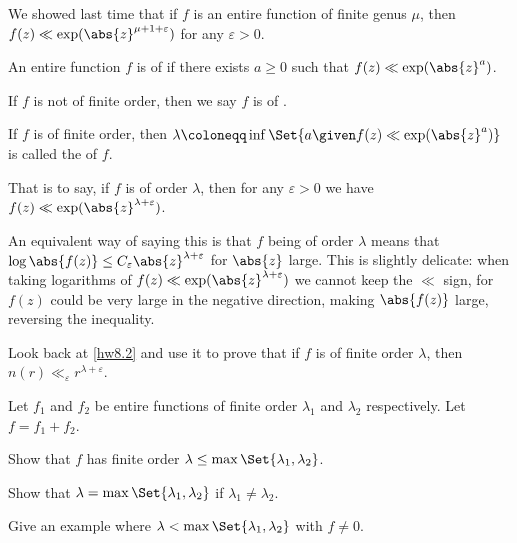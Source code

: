 


We showed last time that if $f$ is an entire function of finite genus $\mu$, then $f(z) \ll \exp(\abs{z}^{\mu + 1 + \varepsilon})$ for any $\varepsilon > 0$.

\begin{definition}[Order]
	An entire function $f$ is of  if there exists $a \geq 0$ such that $f(z) \ll \exp(\abs{z}^a)$.

	If $f$ is not of finite order, then we say $f$ is of .

	If $f$ is of finite order, then $\lambda \coloneqq \inf\Set{a \given f(z) \ll \exp(\abs{z}^a)}$ is called the  of $f$.
\end{definition}

That is to say, if $f$ is of order $\lambda$, then for any $\varepsilon > 0$ we have $f(z) \ll \exp(\abs{z}^{\lambda + \varepsilon})$.

An equivalent way of saying this is that $f$ being of order $\lambda$ means that $\log \abs{f(z)} \leq C_\varepsilon \abs{z}^{\lambda + \varepsilon}$ for $\abs{z}$ large.
This is slightly delicate: when taking logarithms of $f(z) \ll \exp(\abs{z}^{\lambda + \varepsilon})$ we cannot keep the $\ll$ sign, for $f(z)$ could be very large in the negative direction, making $\abs{f(z)}$ large, reversing the inequality.

\begin{exercise}
	Look back at \autoref{hw8.2} and use it to prove that if $f$ is of finite order $\lambda$, then $n(r) \ll_\varepsilon r^{\lambda + \varepsilon}$.
\end{exercise}

\begin{exercise}
	Let $f_1$ and $f_2$ be entire functions of finite order $\lambda_1$ and $\lambda_2$ respectively.
	Let $f = f_1 + f_2$.
	\begin{parts}
		\item Show that $f$ has finite order $\lambda \leq \max\Set{\lambda_1, \lambda_2}$.
		\item Show that $\lambda = \max\Set{\lambda_1, \lambda_2}$ if $\lambda_1 \neq \lambda_2$.
		\item Give an example where $\lambda < \max\Set{\lambda_1, \lambda_2}$ with $f \neq 0$. \qedhere
	\end{parts}
\end{exercise}

